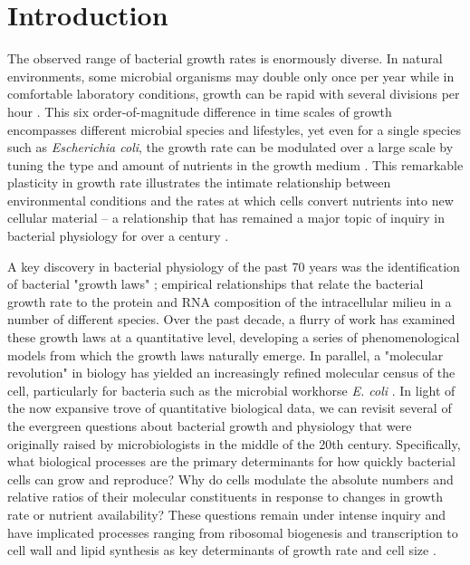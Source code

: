 \section{Introduction}
The observed range of bacterial growth rates is enormously diverse. In natural
environments, some microbial organisms may double only once per year
\citep{mikucki2009} while in comfortable laboratory conditions, growth can be
rapid with several divisions per hour \citep{schaechter1958}. This six
order-of-magnitude difference in time scales of growth encompasses different
microbial species and lifestyles, yet even for a single species such as
\textit{Escherichia coli}, the growth rate can be modulated over a
large scale by tuning the type and amount of nutrients in the growth medium
\citep{liu2005a}. This remarkable plasticity in growth rate illustrates the
intimate relationship between environmental conditions and the rates at which
cells convert nutrients into new cellular material -- a relationship that has
remained a major topic of inquiry in bacterial physiology for over a century
\citep{jun2018}.

A key discovery in bacterial physiology of the past 70 years was the
identification of bacterial "growth laws" \citep{schaechter1958}; empirical
relationships that relate the bacterial growth rate to the protein and RNA
composition of the intracellular milieu in a number of different species. Over
the past decade, a flurry of work \citep{molenaar2009, scott2010, klumpp2014,
basan2015, dai2016, erickson2017} has examined these growth laws at a
quantitative level, developing a series of phenomenological models from which
the growth laws naturally emerge. In parallel, a "molecular revolution" in
biology has yielded an increasingly refined molecular census of the cell,
particularly for bacteria such as the microbial workhorse \textit{E. coli}
\citep{schmidt2016, davidi2016a}. In light of the now expansive trove of
quantitative biological data, we can revisit several of the evergreen questions
about bacterial growth and physiology that were originally raised by
microbiologists in the middle of the 20th century. Specifically, what biological
processes are the primary determinants for how quickly bacterial cells can grow
and reproduce? Why do cells modulate the absolute numbers and relative ratios of
their molecular constituents in response to changes in growth rate or nutrient
availability? These questions remain under intense inquiry and have implicated
processes ranging from ribosomal biogenesis and transcription to cell wall and
lipid synthesis as key determinants of growth rate and cell size
\citep{bremer2008, scott2010, si2017, vadia2017, harris2018, Buke2020, zhang2020}.

